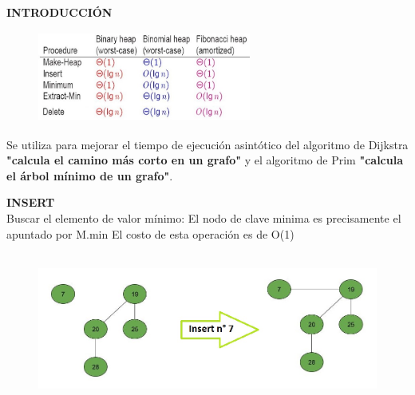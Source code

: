 \documentclass[11pt]{beamer}
\begin{document}
\begin{frame}{\bf \large {}}

{\center \bf \large \color{red} INTRODUCCI\'ON \\}

\begin{figure}[center]
  \includegraphics[width=7cm, height=3cm]{Img/Coste.jpg}
\end{figure}

	Se utiliza para mejorar el tiempo de ejecución asintótico del algoritmo de {\large Dijkstra}  {\bf "calcula el camino más corto en un grafo"} y el algoritmo de {\large Prim}  {\bf "calcula el árbol mínimo de un grafo"}.

\end{frame}

\begin{frame}{\bf \large {}}

{\center \bf \large \color{red} INSERT \\}
	Buscar el elemento de valor mínimo:
El nodo de clave minima es precisamente el apuntado por M.min
El costo de esta operación es de O(1)\\

\begin{figure}[center]

  \includegraphics[width=12cm, height=5cm]{Img/Insert.jpg}
  
\end{figure}
\end{frame}
\end{document}
